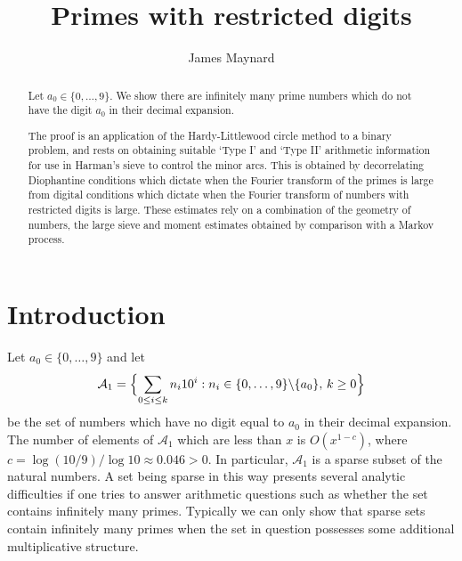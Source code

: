\documentclass[10pt]{amsart}
\theoremstyle{plain}
\numberwithin{sblmm}{thrm}
\numberwithin{equation}{section}
\begin{document}
\title{Primes with restricted digits}
\author{James Maynard}
\address{Magdalen College, Oxford, England, OX1 4AU}
\begin{abstract}
Let $a_0\in\{0,\dots,9\}$. We show there are infinitely many prime numbers which do not have the digit $a_0$ in their decimal expansion.

The proof is an application of the Hardy-Littlewood circle method to a binary problem, and rests on obtaining suitable `Type I' and `Type II' arithmetic information for use in Harman's sieve to control the minor arcs. This is obtained by decorrelating Diophantine conditions which dictate when the Fourier transform of the primes is large from digital conditions which dictate when the Fourier transform of numbers with restricted digits is large. These estimates rely on a combination of the geometry of numbers, the large sieve and moment estimates obtained by comparison with a Markov process.
\end{abstract}
\maketitle
%
%
%
%
%
%
%
\section{Introduction}
%
%
%
%
%
Let $a_0\in\{0,\dots,9\}$ and let 
\[
\mathcal{A}_1=\Bigl\{\sum_{0\le i\le k}n_i 10^i: n_i\in\{0,\dots,9\}\backslash\{a_0\},\,k\ge 0\Bigr\}
\]
be the set of numbers which have no digit equal to $a_0$ in their decimal expansion. The number of elements of $\mathcal{A}_1$ which are less than $x$ is $O(x^{1-c})$, where $c=\log{(10/9)}/\log{10}\approx 0.046>0$. In particular, $\mathcal{A}_1$ is a sparse subset of the natural numbers. A set being sparse in this way presents several analytic difficulties if one tries to answer arithmetic questions such as whether the set contains infinitely many primes. Typically we can only show that sparse sets contain infinitely many primes when the set in question possesses some additional multiplicative structure.
\end{document}
